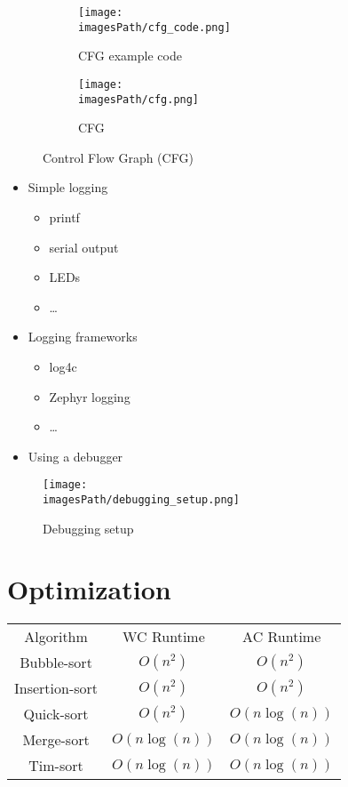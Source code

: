 \begin{figure}[H]
    \centering
    \begin{subfigure}[b]{0.45\textwidth}
        \centering
        \texttt{[image: \\imagesPath/cfg\_code.png]}
        \caption{CFG example code}
    \end{subfigure}
    \hfill
    \begin{subfigure}[b]{0.45\textwidth}
        \centering
        \texttt{[image: \\imagesPath/cfg.png]}
        \caption{CFG}
    \end{subfigure}
       \caption{Control Flow Graph (CFG)}
\end{figure}


\begin{itemize}
    \item Simple logging
    \begin{itemize}
        \item printf
        \item serial output
        \item LEDs
        \item \ldots
    \end{itemize}
    \item Logging frameworks
    \begin{itemize}
        \item log4c
        \item Zephyr logging
        \item \ldots
    \end{itemize}
    \item Using a debugger
\end{itemize}

\begin{figure}[H]
    \centering
    \texttt{[image: \\imagesPath/debugging\_setup.png]}
    \caption{Debugging setup}
\end{figure}


\section{Optimization}
\begin{center}
    \begin{tabular}{ c c c }
     Algorithm      & WC Runtime    & AC Runtime \\ 
     Bubble-sort    & $O(n^2)$      & $O(n^2)$ \\  
     Insertion-sort & $O(n^2)$      & $O(n^2)$ \\  
     Quick-sort     & $O(n^2)$      & $O(n\log(n))$ \\  
     Merge-sort     & $O(n\log(n))$ & $O(n\log(n))$ \\  
     Tim-sort       & $O(n\log(n))$ & $O(n\log(n))$ \\  
    \end{tabular}
\end{center}
 
